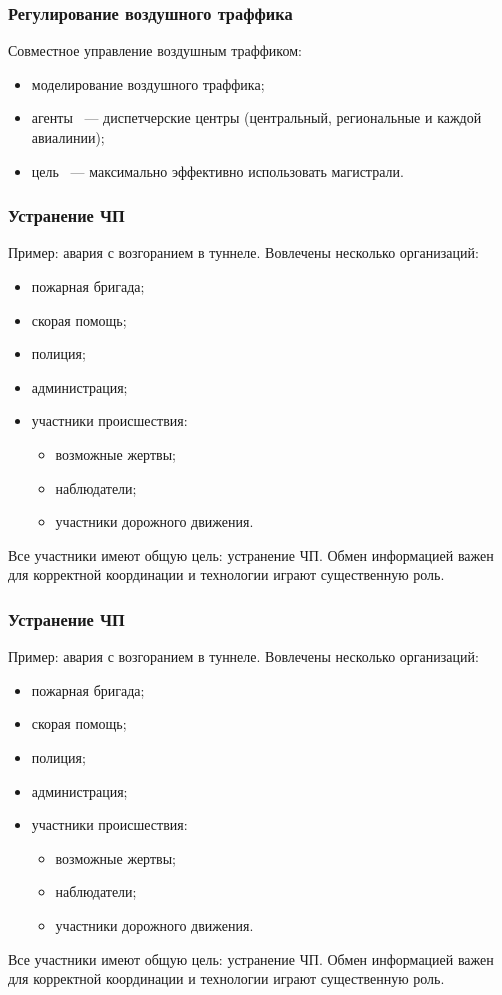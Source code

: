 \documentclass{beamer}
\begin{document}
\begin{frame}
  \frametitle{Регулирование воздушного траффика}
  Совместное управление воздушным траффиком:
  \begin{itemize}
    \item моделирование воздушного траффика;
    \item агенты ~--- диспетчерские центры (центральный, региональные и каждой авиалинии);
    \item цель ~--- максимально эффективно использовать магистрали.
  \end{itemize}
\end{frame}

\begin{frame}
  \frametitle{Устранение ЧП}
  Пример: авария с возгоранием в туннеле. Вовлечены несколько организаций:
  \begin{itemize}
    \item пожарная бригада;
    \item скорая помощь;
    \item полиция;
    \item администрация;
    \item участники происшествия:
      \begin{itemize}
        \item возможные жертвы;
        \item наблюдатели;
        \item участники дорожного движения.
      \end{itemize}
  \end{itemize}

  Все участники имеют общую цель: устранение ЧП. Обмен информацией важен для корректной
  координации и технологии играют существенную роль.
\end{frame}

\begin{frame}
  \frametitle{Устранение ЧП}
  Пример: авария с возгоранием в туннеле. Вовлечены несколько организаций:
  \begin{itemize}
    \item пожарная бригада;
    \item скорая помощь;
    \item полиция;
    \item администрация;
    \item участники происшествия:
      \begin{itemize}
        \item возможные жертвы;
        \item наблюдатели;
        \item участники дорожного движения.
      \end{itemize}
  \end{itemize}

  Все участники имеют общую цель: устранение ЧП. Обмен информацией важен для корректной
  координации и технологии играют существенную роль.
\end{frame}
\end{document}
